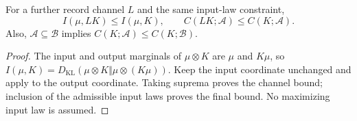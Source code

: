 \begin{corollary}
\label{cor:capacity-processing}
For a further record channel $L$ and the same input-law constraint,
\[
 I(\mu,LK)\le I(\mu,K),\qquad
 C(LK;\mathcal A)\le C(K;\mathcal A).
\]
Also, $\mathcal A\subseteq\mathcal B$ implies
$C(K;\mathcal A)\le C(K;\mathcal B)$.
\end{corollary}
\begin{proof}
The input and output marginals of $\mu\otimes K$ are $\mu$ and
$K\mu$, so
$I(\mu,K)=D_{\mathrm{KL}}(\mu\otimes K\Vert\mu\otimes(K\mu))$.
Keep the input coordinate unchanged and apply
 to the output coordinate.
Taking suprema proves the channel bound; inclusion of the admissible
input laws proves the final bound. No maximizing input law is assumed.
\end{proof}



